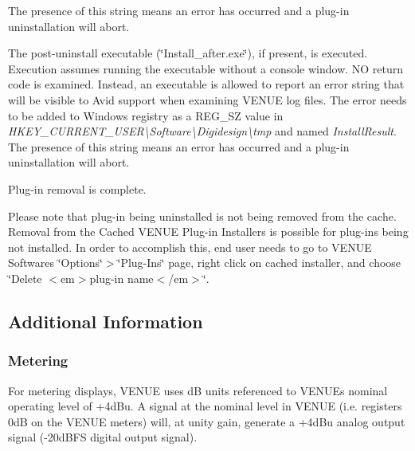 \begin{DoxyEnumerate}
The presence of this string means an error has occurred and a plug-\/in uninstallation will abort.  
\item The post-\/uninstall executable (\char`\"{}\+Install\+\_\+after.\+exe\char`\"{}), if present, is executed. Execution assumes running the executable without a console window. N\+O return code is examined. Instead, an executable is allowed to report an error string that will be visible to Avid support when examining V\+E\+N\+U\+E log files. The error needs to be added to Windows registry as a {\ttfamily R\+E\+G\+\_\+\+S\+Z} value in {\itshape H\+K\+E\+Y\+\_\+\+C\+U\+R\+R\+E\+N\+T\+\_\+\+U\+S\+E\+R\textbackslash{}Software\textbackslash{}Digidesign\textbackslash{}tmp} and named {\itshape Install\+Result}. The presence of this string means an error has occurred and a plug-\/in uninstallation will abort.  
\item Plug-\/in removal is complete.  
\end{DoxyEnumerate}

Please note that plug-\/in being uninstalled is not being removed from the cache. Removal from the Cached V\+E\+N\+U\+E Plug-\/in Installers is possible for plug-\/ins being not installed. In order to accomplish this, end user needs to go to V\+E\+N\+U\+E Software\textquotesingle{}s \char`\"{}\+Options\char`\"{}$>$\char`\"{}\+Plug-\/\+Ins\char`\"{} page, right click on cached installer, and choose \char`\"{}\+Delete $<$em$>$plug-\/in name$<$/em$>$\char`\"{}.



 \hypertarget{a00377_aax_venue_guide__additional_information}{}\subsection{Additional Information}\label{a00377_aax_venue_guide__additional_information}
 \hypertarget{a00377_subsection__aax_venue_guide__additional_information__metering}{}\subsubsection{Metering}\label{a00377_subsection__aax_venue_guide__additional_information__metering}
 For metering displays, V\+E\+N\+U\+E uses d\+B units referenced to V\+E\+N\+U\+E\textquotesingle{}s nominal operating level of +4d\+Bu. A signal at the nominal level in V\+E\+N\+U\+E (i.\+e. registers 0d\+B on the V\+E\+N\+U\+E meters) will, at unity gain, generate a +4d\+Bu analog output signal (-\/20d\+B\+F\+S digital output signal).

